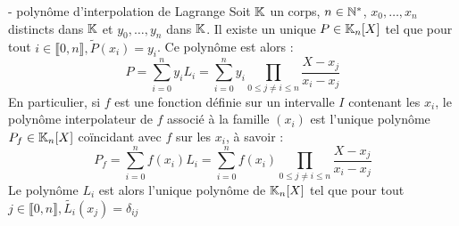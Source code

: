 


\begin{theoreme}{16.66}{ - polynôme d'interpolation de Lagrange}
    Soit $\mathbb{K}$ un corps, $n \in \mathbb{N}^*$, $x_0, \dots, x_n$ distincts dans $\mathbb{K}$ et $y_0,\dots,y_n$ dans $\mathbb{K}$. Il existe un unique $P \in \mathbb{K}_n[X]$ tel que pour tout $i \in \llbracket 0,n \rrbracket, \tilde{P}(x_i) = y_i$. Ce polynôme est alors : $$ P = \sum_{i=0}^{n}y_i L_i = \sum_{i=0}^{n}y_i \prod_{0\leq j \neq i \leq n} \frac{X-x_j}{x_i-x_j}$$
    En particulier, si $f$ est une fonction définie sur un intervalle $I$ contenant les $x_i$, le polynôme interpolateur de $f$ associé à la famille $(x_i)$ est l'unique polynôme $P_f \in \mathbb{K}_n[X]$ coïncidant avec $f$ sur les $x_i$, à savoir : $$P_f = \sum_{i=0}^{n}f(x_i) L_i = \sum_{i=0}^{n}f(x_i) \prod_{0\leq j \neq i \leq n} \frac{X-x_j}{x_i-x_j}$$
    Le polynôme $L_i$ est alors l'unique polynôme de $\mathbb{K}_n[X]$ tel que pour tout $j \in \llbracket 0,n \rrbracket, \tilde{L_i}(x_j) = \delta_{ij}$
\end{theoreme}

